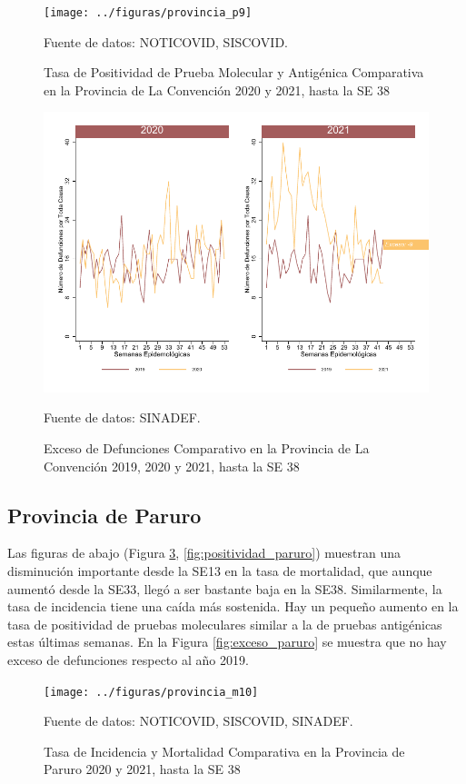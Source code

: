 \documentclass[12pt,a4paper,openany]{book}
\begin{document}
	\begin{figure}[h]
	\caption{Tasa de Positividad de Prueba Molecular y Antigénica Comparativa en la Provincia de La Convención 2020 y 2021, hasta la SE 38}\label{fig:positividad_laconv}
	\begin{center}
		\texttt{[image: ../figuras/provincia\_p9]}
	\end{center}
	{\footnotesize {Fuente de datos: NOTICOVID, SISCOVID.}}
	\end{figure}

	\begin{figure}[h]
	\caption{Exceso de Defunciones Comparativo en la Provincia de La Convención 2019, 2020 y 2021, hasta la SE 38}\label{fig:exceso_laconv}
	\begin{center}
		\includegraphics[width=0.7\linewidth]{../figuras/exceso_9}
	\end{center}
	{\footnotesize {Fuente de datos: SINADEF.}}
	\end{figure}

\clearpage

	\subsection*{Provincia de Paruro}
	\noindent Las figuras de abajo (Figura \ref{fig:inc_mort_paruro}, \ref{fig:positividad_paruro})  muestran una disminución importante desde la SE13 en la tasa de mortalidad, que aunque aumentó desde la SE33, llegó a ser bastante baja en la SE38. Similarmente, la tasa de incidencia tiene una caída más sostenida. Hay un pequeño aumento en la tasa de positividad de pruebas moleculares similar a la de pruebas antigénicas estas últimas semanas. En la Figura \ref{fig:exceso_paruro} se muestra que no hay exceso de defunciones respecto al año 2019.

	\begin{figure}[h]
	\caption{Tasa de Incidencia y Mortalidad Comparativa en la Provincia de Paruro 2020 y 2021, hasta la SE 38}\label{fig:inc_mort_paruro}
	\begin{center}
		\texttt{[image: ../figuras/provincia\_m10]}
	\end{center}
	{\footnotesize {Fuente de datos: NOTICOVID, SISCOVID, SINADEF.}}
	\end{figure}
\end{document}
